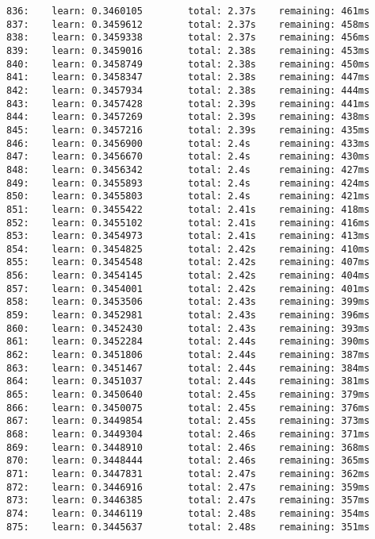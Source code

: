 \documentclass[11pt]{article}
\begin{document}
\begin{Verbatim}[commandchars=\\\{\}]
836:    learn: 0.3460105        total: 2.37s    remaining: 461ms
837:    learn: 0.3459612        total: 2.37s    remaining: 458ms
838:    learn: 0.3459338        total: 2.37s    remaining: 456ms
839:    learn: 0.3459016        total: 2.38s    remaining: 453ms
840:    learn: 0.3458749        total: 2.38s    remaining: 450ms
841:    learn: 0.3458347        total: 2.38s    remaining: 447ms
842:    learn: 0.3457934        total: 2.38s    remaining: 444ms
843:    learn: 0.3457428        total: 2.39s    remaining: 441ms
844:    learn: 0.3457269        total: 2.39s    remaining: 438ms
845:    learn: 0.3457216        total: 2.39s    remaining: 435ms
846:    learn: 0.3456900        total: 2.4s     remaining: 433ms
847:    learn: 0.3456670        total: 2.4s     remaining: 430ms
848:    learn: 0.3456342        total: 2.4s     remaining: 427ms
849:    learn: 0.3455893        total: 2.4s     remaining: 424ms
850:    learn: 0.3455803        total: 2.4s     remaining: 421ms
851:    learn: 0.3455422        total: 2.41s    remaining: 418ms
852:    learn: 0.3455102        total: 2.41s    remaining: 416ms
853:    learn: 0.3454973        total: 2.41s    remaining: 413ms
854:    learn: 0.3454825        total: 2.42s    remaining: 410ms
855:    learn: 0.3454548        total: 2.42s    remaining: 407ms
856:    learn: 0.3454145        total: 2.42s    remaining: 404ms
857:    learn: 0.3454001        total: 2.42s    remaining: 401ms
858:    learn: 0.3453506        total: 2.43s    remaining: 399ms
859:    learn: 0.3452981        total: 2.43s    remaining: 396ms
860:    learn: 0.3452430        total: 2.43s    remaining: 393ms
861:    learn: 0.3452284        total: 2.44s    remaining: 390ms
862:    learn: 0.3451806        total: 2.44s    remaining: 387ms
863:    learn: 0.3451467        total: 2.44s    remaining: 384ms
864:    learn: 0.3451037        total: 2.44s    remaining: 381ms
865:    learn: 0.3450640        total: 2.45s    remaining: 379ms
866:    learn: 0.3450075        total: 2.45s    remaining: 376ms
867:    learn: 0.3449854        total: 2.45s    remaining: 373ms
868:    learn: 0.3449304        total: 2.46s    remaining: 371ms
869:    learn: 0.3448910        total: 2.46s    remaining: 368ms
870:    learn: 0.3448444        total: 2.46s    remaining: 365ms
871:    learn: 0.3447831        total: 2.47s    remaining: 362ms
872:    learn: 0.3446916        total: 2.47s    remaining: 359ms
873:    learn: 0.3446385        total: 2.47s    remaining: 357ms
874:    learn: 0.3446119        total: 2.48s    remaining: 354ms
875:    learn: 0.3445637        total: 2.48s    remaining: 351ms

\end{Verbatim}
\end{document}
